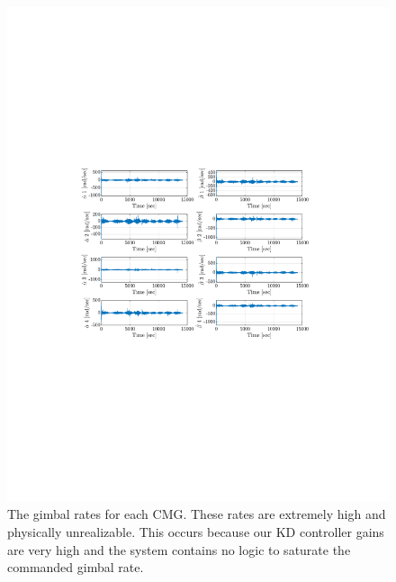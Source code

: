 \documentclass[]{article}
\begin{document}
\begin{figure}[!h]
	\centering
	\includegraphics[width=\linewidth,trim={4cm, 8cm, 4cm, 8cm},clip]{figs/P3Q3.pdf}
	\caption{The gimbal rates for each CMG. These rates are extremely high and physically unrealizable. This occurs because our KD controller gains are very high and the system contains no logic to saturate the commanded gimbal rate.}
	\label{fig:P3Q3}
\end{figure}
\end{document}
